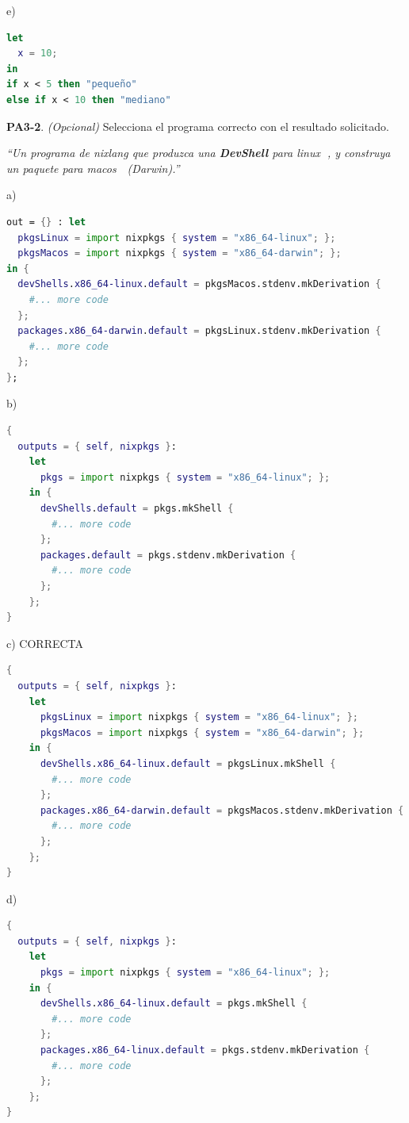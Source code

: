 \begin{opcion}{e)}
\begin{lstlisting}[language=nix]
let
  x = 10;
in
if x < 5 then "pequeño"
else if x < 10 then "mediano"
\end{lstlisting}
\end{opcion}

\textbf{PA3-2}. \emph{(Opcional)} Selecciona el programa correcto con el resultado solicitado.

\emph{``Un programa de nixlang que produzca una \textbf{DevShell} para linux 🐧, y construya un paquete para macos 🍎 (Darwin).''}

\begin{opcion}{a)}
\begin{lstlisting}[language=nix]
out = {} : let
  pkgsLinux = import nixpkgs { system = "x86_64-linux"; };
  pkgsMacos = import nixpkgs { system = "x86_64-darwin"; };
in {
  devShells.x86_64-linux.default = pkgsMacos.stdenv.mkDerivation {
    #... more code
  };
  packages.x86_64-darwin.default = pkgsLinux.stdenv.mkDerivation {
    #... more code
  };
};
\end{lstlisting}
\end{opcion}

\begin{opcion}{b)}
\begin{lstlisting}[language=nix]
{
  outputs = { self, nixpkgs }:
    let
      pkgs = import nixpkgs { system = "x86_64-linux"; };
    in {
      devShells.default = pkgs.mkShell {
        #... more code
      };
      packages.default = pkgs.stdenv.mkDerivation {
        #... more code
      };
    };
}
\end{lstlisting}
\end{opcion}

\begin{opcion}{c)}
CORRECTA
\begin{lstlisting}[language=nix]
{
  outputs = { self, nixpkgs }:
    let
      pkgsLinux = import nixpkgs { system = "x86_64-linux"; };
      pkgsMacos = import nixpkgs { system = "x86_64-darwin"; };
    in {
      devShells.x86_64-linux.default = pkgsLinux.mkShell {
        #... more code
      };
      packages.x86_64-darwin.default = pkgsMacos.stdenv.mkDerivation {
        #... more code
      };
    };
}
\end{lstlisting}
\end{opcion}

\begin{opcion}{d)}
\begin{lstlisting}[language=nix]
{
  outputs = { self, nixpkgs }:
    let
      pkgs = import nixpkgs { system = "x86_64-linux"; };
    in {
      devShells.x86_64-linux.default = pkgs.mkShell {
        #... more code
      };
      packages.x86_64-linux.default = pkgs.stdenv.mkDerivation {
        #... more code
      };
    };
}
\end{lstlisting}
\end{opcion}

